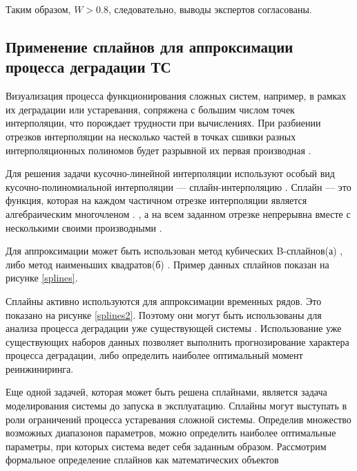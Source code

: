 Таким образом, $W>0.8$, следовательно, выводы экспертов согласованы.

\subsection{Применение сплайнов для аппроксимации процесса деградации ТС}
Визуализация процесса функционирования сложных систем, например, в рамках их деградации или устаревания, сопряжена с большим числом точек интерполяции, что порождает трудности при вычислениях. 
При разбиении отрезков интерполяции на несколько частей в точках сшивки разных интерполяционных полиномов будет разрывной их первая производная \cite{Splines}. 

Для решения задачи кусочно-линейной интерполяции используют особый вид кусочно-полиномиальной интерполяции — сплайн-интерполяцию \cite{Spline2}. 
Сплайн — это функция, которая на каждом частичном отрезке интерполяции является алгебраическим многочленом \cite{Pomax, Splines, Splines3}. , а на всем заданном отрезке непрерывна вместе с несколькими своими производными \cite{Spline2,Spline3,Spline4}.

Для аппроксимации может быть использован метод кубических B-сплайнов(а) \cite{Spline5, Cubic1} , либо метод наименьших квадратов(б) \cite{Spline6, Cubic1}. 
Пример данных сплайнов показан на рисунке \ref{splines}.


Сплайны активно используются для аппроксимации временных рядов.
Это показано на рисунке \ref{splines2}. 
Поэтому они могут быть использованы для анализа процесса деградации уже существующей системы \cite{Doronina, Splines4, Spline6}. 
Использование уже существующих наборов данных позволяет выполнить прогнозирование характера процесса деградации, либо определить наиболее оптимальный момент реинжиниринга.


Еще одной задачей, которая может быть решена сплайнами, является задача моделирования системы до запуска в эксплуатацию. 
Сплайны могут выступать в роли ограничений процесса устаревания сложной системы. 
Определив множество возможных диапазонов параметров, можно определить наиболее оптимальные параметры, при которых система ведет себя заданным образом.
Рассмотрим формальное определение сплайнов как математических объектов

